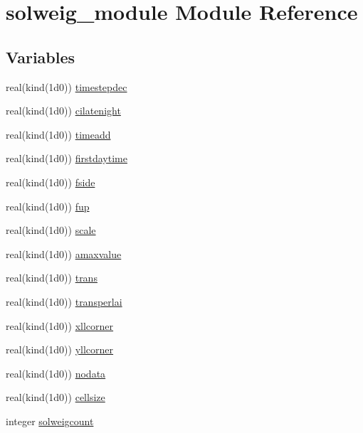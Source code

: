 \hypertarget{namespacesolweig__module}{}\section{solweig\+\_\+module Module Reference}
\label{namespacesolweig__module}
\subsection*{Variables}
\begin{DoxyCompactItemize}
\item 
real(kind(1d0)) \hyperlink{namespacesolweig__module_a322c7874b1f125d732948c1ea203d2e3}{timestepdec}
\item 
real(kind(1d0)) \hyperlink{namespacesolweig__module_a4339bc64ae33d2ff852f5281224a4954}{cilatenight}
\item 
real(kind(1d0)) \hyperlink{namespacesolweig__module_a0e622f7be5cb292d0a8df052b0810910}{timeadd}
\item 
real(kind(1d0)) \hyperlink{namespacesolweig__module_a55653ebd3344c1899b9d5ab2b9975142}{firstdaytime}
\item 
real(kind(1d0)) \hyperlink{namespacesolweig__module_a1ad38870ebe29d6487113345dd9f16ae}{fside}
\item 
real(kind(1d0)) \hyperlink{namespacesolweig__module_a432f39e2ce08b7a5a5ae823cd0b1b3f9}{fup}
\item 
real(kind(1d0)) \hyperlink{namespacesolweig__module_a5ab819878e67cce03ccd8ee36f20acf3}{scale}
\item 
real(kind(1d0)) \hyperlink{namespacesolweig__module_a0455899b7ac1e0dcf212eab8b302276e}{amaxvalue}
\item 
real(kind(1d0)) \hyperlink{namespacesolweig__module_af7c3a5fbe4297a3e22af0e2b350c0311}{trans}
\item 
real(kind(1d0)) \hyperlink{namespacesolweig__module_abd04dc024e2ed4adfe36e165d6e5a92e}{transperlai}
\item 
real(kind(1d0)) \hyperlink{namespacesolweig__module_aa077076360ddac9784d30693f88a4fc8}{xllcorner}
\item 
real(kind(1d0)) \hyperlink{namespacesolweig__module_ac214a03385acfaa638e2a31c58f182ee}{yllcorner}
\item 
real(kind(1d0)) \hyperlink{namespacesolweig__module_a0792a6e09bd22061b90eb624cd50e765}{nodata}
\item 
real(kind(1d0)) \hyperlink{namespacesolweig__module_a8e19893b8a4fa33e4a195d94a8aba8e2}{cellsize}
\item 
integer \hyperlink{namespacesolweig__module_a466d8cf9dd423b05c00deaf1ac231f2c}{solweigcount}
\end{DoxyCompactItemize}


